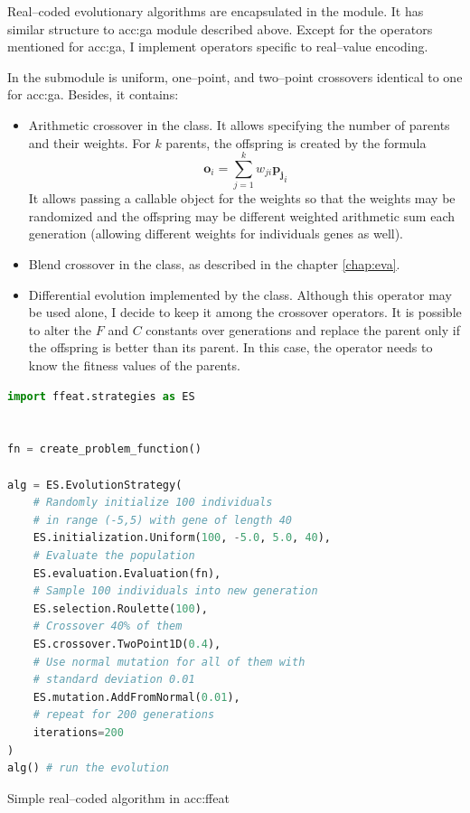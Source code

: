 Real--coded evolutionary algorithms are encapsulated in the  module. It has similar structure to \acrshort{acc:ga} module described above. Except for the operators mentioned for \acrshort{acc:ga}, I implement operators specific to real--value encoding.

In the  submodule is uniform, one--point, and two--point crossovers identical to one for \acrshort{acc:ga}. Besides, it contains:
\begin{itemize}
    \item Arithmetic crossover in the  class. It allows specifying the number of parents and their weights. For $k$ parents, the offspring is created by the formula 
    $$\mathbf{o}_i=\sum_{j=1}^k w_{ji}\mathbf{p_j}_i$$
    It allows passing a callable object for the weights so that the weights may be randomized and the offspring may be different weighted arithmetic sum each generation (allowing different weights for individuals genes as well).
    \item Blend crossover in the  class, as described in the chapter \ref{chap:eva}.
    \item Differential evolution implemented by the  class. Although this operator may be used alone, I decide to keep it among the crossover operators. It is possible to alter the $F$ and $C$ constants over generations and replace the parent only if the offspring is better than its parent. In this case, the operator needs to know the fitness values of the parents.
\end{itemize}

\begin{algorithm}[b!]
\begin{lstlisting}[language=Python, xrightmargin=18pt]
import ffeat.strategies as ES


fn = create_problem_function()

alg = ES.EvolutionStrategy(
    # Randomly initialize 100 individuals 
    # in range (-5,5) with gene of length 40
    ES.initialization.Uniform(100, -5.0, 5.0, 40),
    # Evaluate the population
    ES.evaluation.Evaluation(fn),
    # Sample 100 individuals into new generation
    ES.selection.Roulette(100),
    # Crossover 40% of them
    ES.crossover.TwoPoint1D(0.4),
    # Use normal mutation for all of them with 
    # standard deviation 0.01
    ES.mutation.AddFromNormal(0.01),
    # repeat for 200 generations
    iterations=200
)
alg() # run the evolution
\end{lstlisting}
\caption{Simple real--coded algorithm in \acrshort*{acc:ffeat}}
\label{alg:esffeat}
\end{algorithm}

